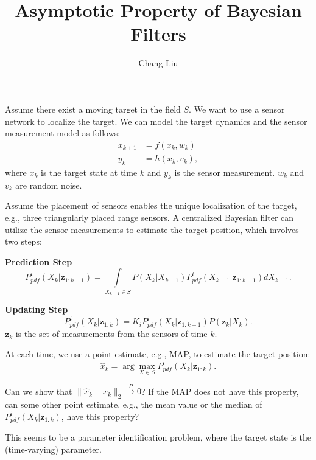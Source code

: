 \documentclass[]{article}
\title{Asymptotic Property of Bayesian Filters}
\author{Chang Liu}
\begin{document}
\maketitle

Assume there exist a moving target in the field $S$. 
We want to use a sensor network to localize the target.
We can model the target dynamics and the sensor measurement model as follows:
\begin{align}
x_{k+1}&=f(x_k,w_k)\\
y_k&=h(x_k,v_k),
\end{align}
where $x_k$ is the target state at time $k$ and $y_k$ is the sensor measurement. $w_k$ and $v_k$ are random noise.

Assume the placement of sensors enables the unique localization of the target, e.g., three triangularly placed range sensors.
A centralized Bayesian filter can utilize the sensor measurements to estimate the target position, which involves two steps:

\textbf{Prediction Step}
\begin{equation*}
P^i_{pdf}(X_k|\mathbf{z}_{1:k-1})
=\int\limits_{X_{k-1}\in S} P(X_k|X_{k-1})P^i_{pdf}(X_{k-1}|\mathbf{z}_{1:k-1})dX_{k-1}.
\end{equation*}

\textbf{Updating Step}
\begin{equation*}
P^i_{pdf}(X_k|\mathbf{z}_{1:k})
= K_iP^i_{pdf}(X_k|\mathbf{z}_{1:k-1})P(\mathbf{z}_k|X_k).
\end{equation*}
$\mathbf{z}_k$ is the set of measurements from the sensors of time $k$.

At each time, we use a point estimate, e.g., MAP, to estimate the target position:
\begin{equation*}
\hat{x}_k=\arg\max_{X\in S} P^i_{pdf}(X_k|\mathbf{z}_{1:k}).
\end{equation*}

Can we show that $\|\hat{x}_k -x_k\|_2 \overset{P}{\longrightarrow} 0$?
If the MAP does not have this property, can some other point estimate, e.g., the mean value or the median of $P^i_{pdf}(X_k|\mathbf{z}_{1:k})$, have this property? 

This seems to be a parameter identification problem, where the target state is the (time-varying) parameter.
\end{document}
